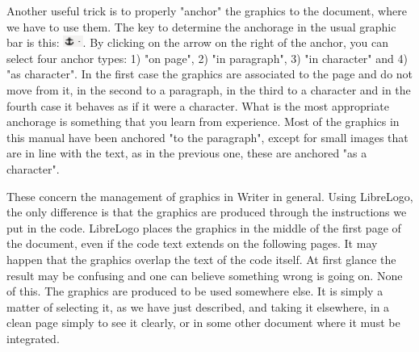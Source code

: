 Another useful trick is to properly "anchor" the graphics to the document, where we have to use them. The key to determine the anchorage in the usual graphic bar is this: \includegraphics[height=1em]{./images/librelogo/AncoraLO.png}. By clicking on the arrow on the right of the anchor, you can select four anchor types: 1) "on page", 2) "in paragraph", 3) "in character" and 4) "as character". In the first case the graphics are associated to the page and do not move from it, in the second to a paragraph, in the third to a character and in the fourth case it behaves as if it were a character. What is the most appropriate anchorage is something that you learn from experience. Most of the graphics in this manual have been anchored "to the paragraph", except for small images that are in line with the text, as in the previous one, these are anchored "as a character".

These concern the management of graphics in Writer in general. Using LibreLogo, the only difference is that the graphics are produced through the instructions we put in the code. LibreLogo places the graphics in the middle of the first page of the document, even if the code text extends on the following pages. It may happen that the graphics overlap the text of the code itself. At first glance the result may be confusing and one can believe something wrong is going on. None of this. The graphics are produced to be used somewhere else. It is simply a matter of selecting it, as we have just described, and taking it elsewhere, in a clean page simply to see it clearly, or in some other document where it must be integrated.


